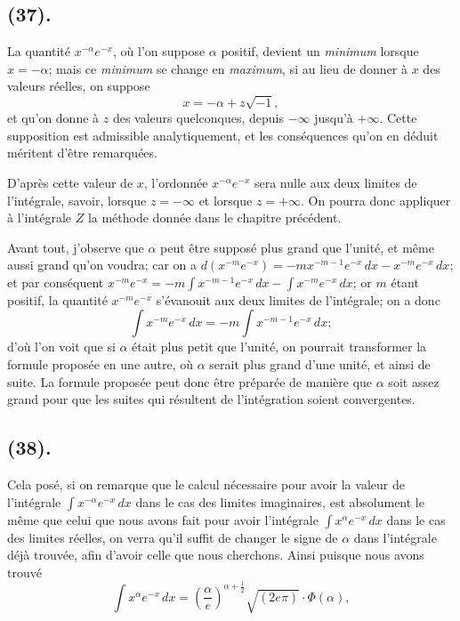 \documentclass{article}
\begin{document}
\subsection*{(37).}

La quantité $x^{-\alpha}e^{-x}$, où l'on suppose $\alpha$ positif, devient un \emph{minimum} lorsque $x=-\alpha$; mais ce \emph{minimum} se change en \emph{maximum}, si au lieu de donner à $x$ des valeurs réelles, on suppose
\[ x=-\alpha+z\sqrt{-1}, \]
et qu'on donne à $z$ des valeurs quelconques, depuis $-\infty$ jusqu'à $+\infty$. Cette supposition est admissible analytiquement, et les conséquences qu'on en déduit méritent d'être remarquées.

D'après cette valeur de $x$, l'ordonnée $x^{-\alpha}e^{-x}$ sera nulle aux deux limites de l'intégrale, savoir, lorsque $z=-\infty$ et lorsque $z=+\infty$. On pourra donc appliquer à l'intégrale $Z$ la méthode donnée dans le chapitre précédent.

Avant tout, j'observe que $\alpha$ peut être supposé plus grand que l'unité, et même aussi grand qu'on voudra; car on a $d(x^{-m}e^{-x})=-mx^{-m-1}e^{-x}\,dx-x^{-m}e^{-x}\,dx$; et par conséquent $x^{-m}e^{-x}=-m\displaystyle\int x^{-m-1}e^{-x}\,dx-\displaystyle\int x^{-m}e^{-x}\,dx$; or $m$ étant positif, la quantité $x^{-m}e^{-x}$ s'évanouit aux deux limites de l'intégrale; on a donc
\[ \int x^{-m}e^{-x}\,dx=-m\int x^{-m-1}e^{-x}\,dx; \]
d'où l'on voit que si $\alpha$ était plus petit que l'unité, on pourrait transformer la formule proposée en une autre, où $\alpha$ serait plus grand d'une unité, et ainsi de suite. La formule proposée peut donc être préparée de manière que $\alpha$ soit assez grand pour que les suites qui résultent de l'intégration soient convergentes.

\subsection*{(38).}

Cela posé, si on remarque que le calcul nécessaire pour avoir la valeur de l'intégrale $\displaystyle\int x^{-\alpha}e^{-x}\,dx$ dans le cas des limites imaginaires, est absolument le même que celui que nous avons fait pour avoir l'intégrale $\displaystyle\int x^{\alpha}e^{-x}\,dx$ dans le cas des limites réelles, on verra qu'il suffit de changer le signe de $\alpha$ dans l'intégrale déjà trouvée, afin d'avoir celle que nous cherchons. Ainsi puisque nous avons trouvé
\[ \int x^{\alpha}e^{-x}\,dx=\left(\frac{\alpha}{e}\right)^{\alpha+\frac{1}{2}}\sqrt{(2e\pi)}\cdot\Phi(\alpha), \]
\end{document}
